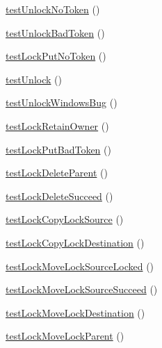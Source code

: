 \begin{DoxyCompactItemize}
\mbox{\hyperlink{class_sabre_1_1_d_a_v_1_1_locks_1_1_plugin_test_a61b6ba79cce06a9e3aacd754ab49392b}{test\+Unlock\+No\+Token}} ()
\item 
\mbox{\hyperlink{class_sabre_1_1_d_a_v_1_1_locks_1_1_plugin_test_a2a30c5755832990efbfc7f34d2f8ef69}{test\+Unlock\+Bad\+Token}} ()
\item 
\mbox{\hyperlink{class_sabre_1_1_d_a_v_1_1_locks_1_1_plugin_test_a86cd777f3ba390cb440cc478ae2aa437}{test\+Lock\+Put\+No\+Token}} ()
\item 
\mbox{\hyperlink{class_sabre_1_1_d_a_v_1_1_locks_1_1_plugin_test_a74521a9c1c9ebbea800d9c9a8447880b}{test\+Unlock}} ()
\item 
\mbox{\hyperlink{class_sabre_1_1_d_a_v_1_1_locks_1_1_plugin_test_ae8b51113a8e97bfb5aa89c762346d172}{test\+Unlock\+Windows\+Bug}} ()
\item 
\mbox{\hyperlink{class_sabre_1_1_d_a_v_1_1_locks_1_1_plugin_test_a17806ca7b98ff9e7e17c97d8ccb30a20}{test\+Lock\+Retain\+Owner}} ()
\item 
\mbox{\hyperlink{class_sabre_1_1_d_a_v_1_1_locks_1_1_plugin_test_af6f30e6b870bd92032f4ed9ec8a2b418}{test\+Lock\+Put\+Bad\+Token}} ()
\item 
\mbox{\hyperlink{class_sabre_1_1_d_a_v_1_1_locks_1_1_plugin_test_a552069437fa31a9df512a83953e0a5da}{test\+Lock\+Delete\+Parent}} ()
\item 
\mbox{\hyperlink{class_sabre_1_1_d_a_v_1_1_locks_1_1_plugin_test_a7ad50b80319ac2ce23752d3df84f1762}{test\+Lock\+Delete\+Succeed}} ()
\item 
\mbox{\hyperlink{class_sabre_1_1_d_a_v_1_1_locks_1_1_plugin_test_ad6feff3f6f1acfb7832a0500981ffda3}{test\+Lock\+Copy\+Lock\+Source}} ()
\item 
\mbox{\hyperlink{class_sabre_1_1_d_a_v_1_1_locks_1_1_plugin_test_aa7664f00903dac71f12a6bcff5e8c46c}{test\+Lock\+Copy\+Lock\+Destination}} ()
\item 
\mbox{\hyperlink{class_sabre_1_1_d_a_v_1_1_locks_1_1_plugin_test_ab568b559c2144c9eced7c8a9253f98b6}{test\+Lock\+Move\+Lock\+Source\+Locked}} ()
\item 
\mbox{\hyperlink{class_sabre_1_1_d_a_v_1_1_locks_1_1_plugin_test_a2d9b8ae779c3fa2c3a23abf9c59ffe77}{test\+Lock\+Move\+Lock\+Source\+Succeed}} ()
\item 
\mbox{\hyperlink{class_sabre_1_1_d_a_v_1_1_locks_1_1_plugin_test_a3dcfc53a0bb5d1ae33c76bc6639a311f}{test\+Lock\+Move\+Lock\+Destination}} ()
\item 
\mbox{\hyperlink{class_sabre_1_1_d_a_v_1_1_locks_1_1_plugin_test_acd8d43336d2e541e0691fffb6c5cf152}{test\+Lock\+Move\+Lock\+Parent}} ()

\end{DoxyCompactItemize}
